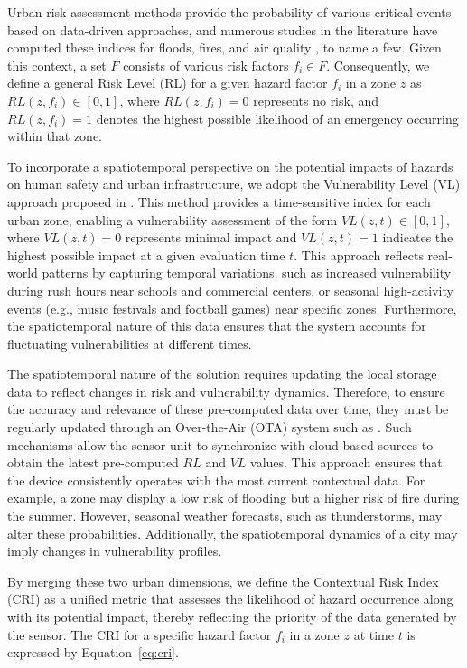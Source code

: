 \documentclass[conference]{IEEEtran}
\begin{document}
Urban risk assessment methods provide the probability of various critical events based on data-driven approaches, and numerous studies in the literature have computed these indices for floods, fires, and air quality \cite{urbinaSpatialVulnerabilityAssessment2023,idirMappingUrbanAir2021}, to name a few. Given this context, a set \( F \) consists of various risk factors \( f_i \in F \). Consequently, we define a general Risk Level (RL) for a given hazard factor \( f_i \) in a zone \( z \) as \( RL(z, f_i) \in [0,1] \), where \( RL(z, f_i) = 0 \) represents no risk, and \( RL(z, f_i) = 1 \) denotes the highest possible likelihood of an emergency occurring within that zone.

To incorporate a spatiotemporal perspective on the potential impacts of hazards on human safety and urban infrastructure, we adopt the Vulnerability Level (VL) approach proposed in \cite{bittencourtDatadrivenClusteringApproach2024}. This method provides a time-sensitive index for each urban zone, enabling a vulnerability assessment of the form \( VL(z, t) \in [0, 1] \), where \( VL(z, t) = 0 \) represents minimal impact and \( VL(z, t) = 1 \) indicates the highest possible impact at a given evaluation time \( t \). This approach reflects real-world patterns by capturing temporal variations, such as increased vulnerability during rush hours near schools and commercial centers, or seasonal high-activity events (e.g., music festivals and football games) near specific zones. Furthermore, the spatiotemporal nature of this data ensures that the system accounts for fluctuating vulnerabilities at different times.

The spatiotemporal nature of the solution requires updating the local storage data to reflect changes in risk and vulnerability dynamics. Therefore, to ensure the accuracy and relevance of these pre-computed data over time, they must be regularly updated through an Over-the-Air (OTA) system such as \cite{chienNovelMQTT0Based2022}. Such mechanisms allow the sensor unit to synchronize with cloud-based sources to obtain the latest pre-computed \( RL \) and \( VL \) values. This approach ensures that the device consistently operates with the most current contextual data. For example, a zone may display a low risk of flooding but a higher risk of fire during the summer. However, seasonal weather forecasts, such as thunderstorms, may alter these probabilities. Additionally, the spatiotemporal dynamics of a city may imply changes in vulnerability profiles.

By merging these two urban dimensions, we define the Contextual Risk Index (CRI) as a unified metric that assesses the likelihood of hazard occurrence along with its potential impact, thereby reflecting the priority of the data generated by the sensor. The CRI for a specific hazard factor \( f_i \) in a zone \( z \) at time \( t \) is expressed by Equation~\ref{eq:cri}.
\end{document}
